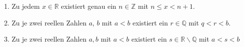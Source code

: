 \begin{enumerate}[label=\alph*)]
    \item Zu jedem $x \in \mathbb{R}$ existiert genau ein $n \in \mathbb{Z}$ mit $n \leq x <  n+1$.
    \item Zu je zwei reellen Zahlen $a$, $b$ mit $a < b$ existiert ein $r \in \mathbb{Q}$ mit $q < r < b$.
    \item Zu je zwei reellen Zahlen $a, b$ mit $a < b$ existiert ein $s \in \mathbb{R} \backslash \mathbb{Q}$ mit $a < s < b$
\end{enumerate}